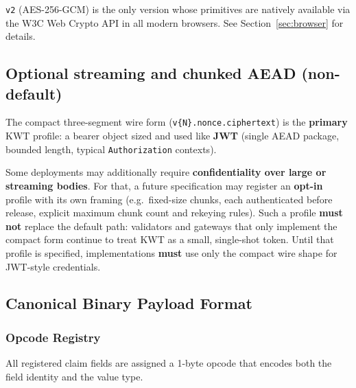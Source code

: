 \documentclass[11pt, letterpaper]{article}
\begin{document}
\begin{notebox}
\texttt{v2} (AES-256-GCM) is the only version whose primitives are natively
available via the W3C Web Crypto API in all modern browsers. See
Section~\ref{sec:browser} for details.
\end{notebox}

\subsection{Optional streaming and chunked AEAD (non-default)}

The compact three-segment wire form (\texttt{v\{N\}.nonce.ciphertext}) is the
\textbf{primary} KWT profile: a bearer object sized and used like \textbf{JWT}
(single AEAD package, bounded length, typical \texttt{Authorization} contexts).

Some deployments may additionally require \textbf{confidentiality over large or
streaming bodies}. For that, a future specification may register an
\textbf{opt-in} profile with its own framing (e.g.\ fixed-size chunks, each
authenticated before release, explicit maximum chunk count and rekeying rules).
Such a profile \textbf{must not} replace the default path: validators and
gateways that only implement the compact form continue to treat KWT as a
small, single-shot token. Until that profile is specified, implementations
\textbf{must} use only the compact wire shape for JWT-style credentials.

\subsection{Canonical Binary Payload Format}

\subsubsection{Opcode Registry}

All registered claim fields are assigned a 1-byte opcode that encodes both
the field identity and the value type.
\end{document}
